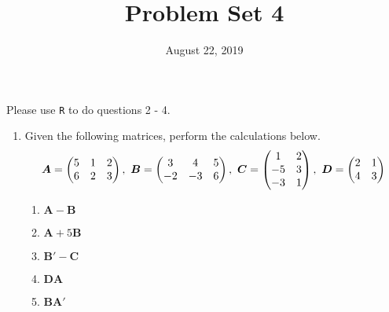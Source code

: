 \documentclass[pdflatex, letterpaper, 12pt]{scrartcl}
\title{Problem Set 4}
\date{August 22, 2019}
\begin{document}
\maketitle

Please use \texttt{R} to do questions 2 - 4.

\begin{enumerate}
\item Given the following matrices, perform the calculations below.
\begin{equation}
\bm{A} = \begin{pmatrix}
5 & 1 & 2 \\
6 & 2 & 3 \\
\end{pmatrix}, \ 
\bm{B} = \begin{pmatrix}
3 & 4 & 5 \\
-2 & -3 & 6 \\
\end{pmatrix}, \ 
\bm{C} = \begin{pmatrix}
1 & 2 \\
-5 & 3 \\
-3 & 1 \\
\end{pmatrix},\ 
\bm{D} = \begin{pmatrix}
2 & 1 \\
4 & 3\\
\end{pmatrix} \notag
\end{equation}
 \begin{enumerate}[label=(\alph*)]
 \item $\bm{A} - \bm{B}$
 \item $\bm{A} + 5\bm{B}$
 \item $\bm{B}' - \bm{C}$
 \item $\bm{DA}$
 \item $\bm{BA}'$
 \end{enumerate}


\end{enumerate}
\end{document}
